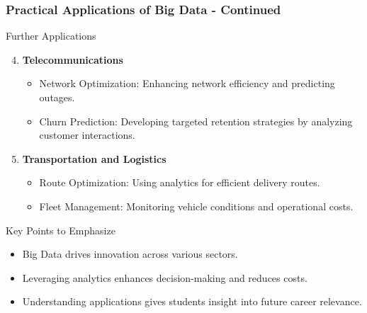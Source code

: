\documentclass[aspectratio=169]{beamer}
\begin{document}
\begin{frame}[fragile]
    \frametitle{Practical Applications of Big Data - Continued}
    \begin{block}{Further Applications}
        \begin{enumerate}
            \setcounter{enumi}{3} %
            \item \textbf{Telecommunications}
            \begin{itemize}
                \item Network Optimization: Enhancing network efficiency and predicting outages.
                \item Churn Prediction: Developing targeted retention strategies by analyzing customer interactions.
            \end{itemize}

            \item \textbf{Transportation and Logistics}
            \begin{itemize}
                \item Route Optimization: Using analytics for efficient delivery routes.
                \item Fleet Management: Monitoring vehicle conditions and operational costs.
            \end{itemize}
        \end{enumerate}
    \end{block}

    \begin{block}{Key Points to Emphasize}
        \begin{itemize}
            \item Big Data drives innovation across various sectors.
            \item Leveraging analytics enhances decision-making and reduces costs.
            \item Understanding applications gives students insight into future career relevance.
        \end{itemize}
    \end{block}
\end{frame}
\end{document}
